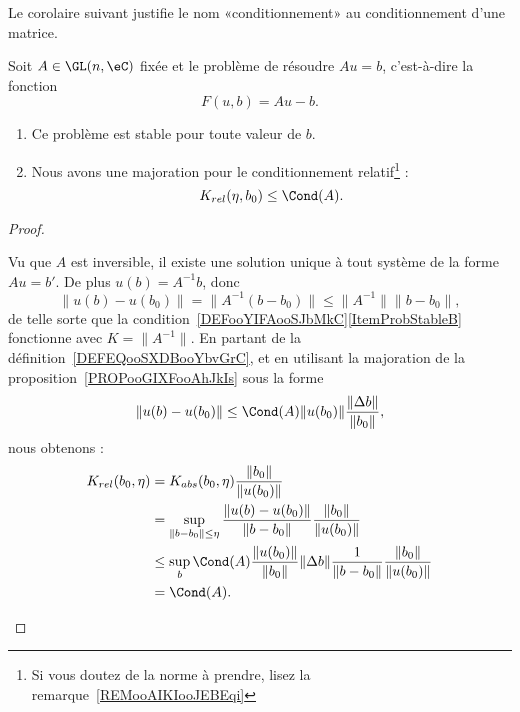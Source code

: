 Le corolaire suivant justifie le nom «conditionnement» au conditionnement d'une matrice.
\begin{corollary}       \label{CORooXKPWooJVHVvh}
	Soit \( A\in \GL(n,\eC)\) fixée et le problème de résoudre \( Au=b\), c'est-à-dire la fonction
	\begin{equation}
		F(u,b)=Au-b.
	\end{equation}
	\begin{enumerate}
		\item
		      Ce problème est stable pour toute valeur de \( b\).
		\item
		      Nous avons une majoration pour le conditionnement relatif\footnote{Si vous doutez de la norme à prendre, lisez la remarque~\ref{REMooAIKIooJEBEqi}} :
		      \begin{equation}        \label{EQooZHQJooTMKYfr}
			      K_{rel}(\eta,b_0)\leq \Cond(A).
		      \end{equation}
	\end{enumerate}
\end{corollary}

\begin{proof}
	\begin{subproof}
		\spitem[Stabilité]
		Vu que \( A\) est inversible, il existe une solution unique à tout système de la forme \( Au=b'\). De plus \( u(b)=A^{-1} b\), donc
		\begin{equation}
			\| u(b)-u(b_0) \|= \| A^{-1}(b-b_0) \|\leq \| A^{-1} \|\| b-b_0 \|,
		\end{equation}
		de telle sorte que la condition~\ref{DEFooYIFAooSJbMkC}\ref{ItemProbStableB} fonctionne avec \( K=\| A^{-1} \|\).
		\spitem[Conditionnement]
		En partant de la définition~\ref{DEFEQooSXDBooYbvGrC}, et en utilisant la majoration de la proposition~\ref{PROPooGIXFooAhJkIs} sous la forme
		\begin{equation}
			\| u(b)-u(b_0) \|\leq \Cond(A)\| u(b_0) \|\frac{ \| \Delta b \| }{ \| b_0 \| },
		\end{equation}
		nous obtenons :
		\begin{subequations}
			\begin{align}
				K_{rel}(b_0,\eta) & =K_{abs}(b_0,\eta)\frac{ \| b_0 \| }{ \| u(b_0) \| }                                                                         \\
				                  & =\sup_{\| b-b_0 \|\leq \eta}\frac{ \| u(b)-u(b_0) \| }{ \| b-b_0 \| }\frac{ \| b_0 \| }{ \| u(b_0) \| }                      \\
				                  & \leq \sup_b\Cond(A)\frac{ \| u(b_0) \| }{ \| b_0 \| }\| \Delta b \|\frac{1}{ \| b-b_0 \| }\frac{ \| b_0 \| }{ \| u(b_0) \| } \\
				                  & =\Cond(A).
			\end{align}
		\end{subequations}
	\end{subproof}
\end{proof}

